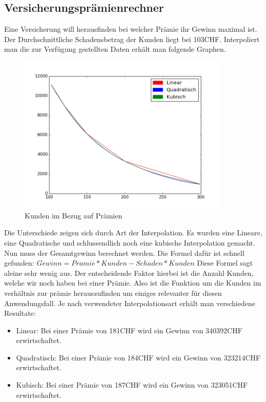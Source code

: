 \documentclass[10pt]{article}         %
\begin{document}
\subsection{Versicherungsprämienrechner}
Eine Versicherung will herausfinden bei welcher Prämie ihr Gewinn maximal ist. Der Durchschnittliche Schadensbetrag der Kunden liegt bei 103CHF. Interpoliert man die zur Verfügung gestellten Daten erhält man folgende Graphen.
\begin{figure}[!ht]
    \centering
    \includegraphics[width=0.9\textwidth]{customres}
    \caption{Kunden im Bezug auf Prämien}\label{customers}
\end{figure}
Die Unterschiede zeigen sich durch Art der Interpolation. Es wurden eine Lineare, eine Quadratische und schlussendlich noch eine kubische Interpolation gemacht. \\
Nun muss der Gesamtgewinn berechnet werden. Die Formel dafür ist schnell gefunden: $Gewinn = Pr\ddot{a}mie*Kunden - Schaden*Kunden$ Diese Formel sagt aleine sehr wenig aus. Der entscheidende Faktor hierbei ist die Anzahl Kunden, welche wir noch haben bei einer Prämie. Also ist die Funktion um die Kunden im verhältnis zur prämie herauszufinden um einiges relevanter für diesen Anwendungsfall.
Je nach verwendeter Interpolationsart erhält man verschiedene Resultate: \\
\begin{itemize}
    \item Linear: Bei einer Prämie von 181CHF wird ein Gewinn von 340392CHF erwirtschaftet.
    \item Quadratisch: Bei einer Prämie von 184CHF wird ein Gewinn von 323214CHF erwirtschaftet.
    \item Kubisch: Bei einer Prämie von 187CHF wird ein Gewinn von 323051CHF erwirtschaftet.
\end{itemize}
\end{document}
